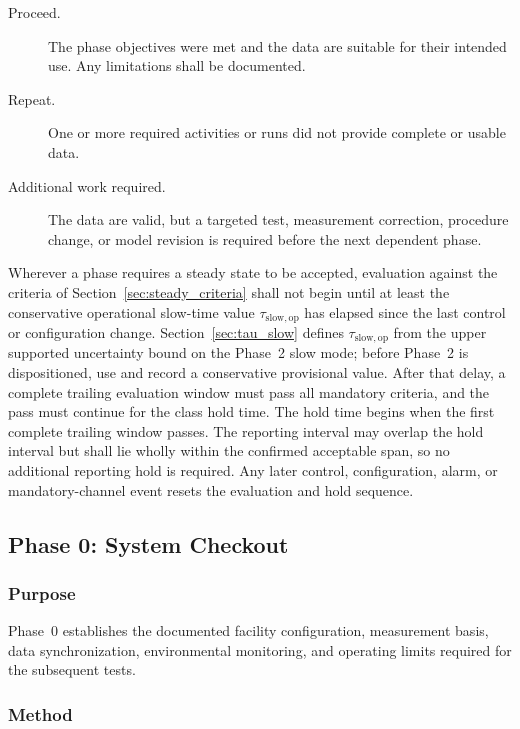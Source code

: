 \documentclass[11pt]{article}
\begin{document}
\begin{description}
    \item[Proceed.] The phase objectives were met and the data are suitable for their intended use. Any limitations shall be documented.

    \item[Repeat.] One or more required activities or runs did not provide complete or usable data.

    \item[Additional work required.] The data are valid, but a targeted test, measurement correction, procedure change, or model revision is required before the next dependent phase.
\end{description}

Wherever a phase requires a steady state to be accepted, evaluation against the criteria of Section~\ref{sec:steady_criteria} shall not begin until at least the conservative operational slow-time value $\tau_{\mathrm{slow,op}}$ has elapsed since the last control or configuration change. Section~\ref{sec:tau_slow} defines $\tau_{\mathrm{slow,op}}$ from the upper supported uncertainty bound on the Phase~2 slow mode; before Phase~2 is dispositioned, use and record a conservative provisional value. After that delay, a complete trailing evaluation window must pass all mandatory criteria, and the pass must continue for the class hold time. The hold time begins when the first complete trailing window passes. The reporting interval may overlap the hold interval but shall lie wholly within the confirmed acceptable span, so no additional reporting hold is required. Any later control, configuration, alarm, or mandatory-channel event resets the evaluation and hold sequence.

\subsection{Phase 0: System Checkout}
\label{sec:phase0}

\subsubsection{Purpose}

Phase~0 establishes the documented facility configuration, measurement basis, data synchronization, environmental monitoring, and operating limits required for the subsequent tests.

\subsubsection{Method}
\end{document}
